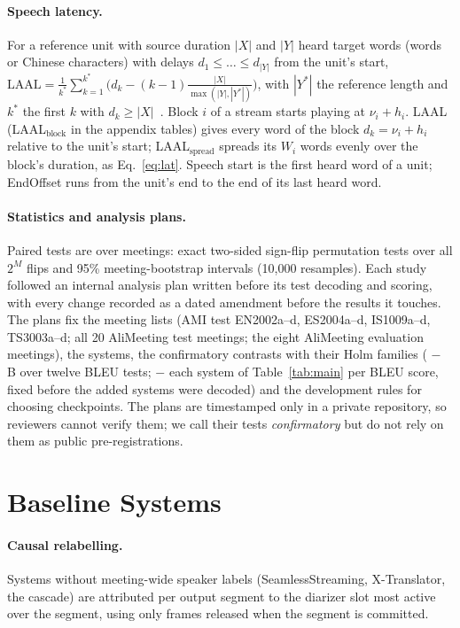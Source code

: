 \paragraph{Speech latency.} For a reference unit with source duration $|X|$ and $|Y|$ heard target words (words or
Chinese characters) with delays $d_1\le\dots\le d_{|Y|}$ from the unit's start,
$\mathrm{LAAL}=\frac{1}{k^\ast}\sum_{k=1}^{k^\ast}\big(d_k-(k-1)\frac{|X|}{\max(|Y|,|Y^\ast|)}\big)$, with $|Y^\ast|$ the
reference length and $k^\ast$ the first $k$ with $d_k\ge|X|$~\citep{papi2022over}. Block $i$ of a stream starts
playing at $\nu_i+h_i$. LAAL (LAAL$_\text{block}$ in the appendix tables) gives every word of the block
$d_k=\nu_i+h_i$ relative to the unit's start; LAAL$_\text{spread}$ spreads its $W_i$ words evenly over the block's
duration, as Eq.~\eqref{eq:lat}. Speech start is the first heard word of a unit; EndOffset runs from the unit's end to
the end of its last heard word.

\paragraph{Statistics and analysis plans.} Paired tests are over meetings: exact two-sided sign-flip permutation tests
over all $2^M$ flips and 95\% meeting-bootstrap intervals (10{,}000 resamples). Each study followed an internal analysis
plan written before its test decoding and scoring, with every change recorded as a dated amendment before the results
it touches. The plans fix the meeting lists (AMI test EN2002a--d, ES2004a--d, IS1009a--d, TS3003a--d; all 20 AliMeeting
test meetings; the eight AliMeeting evaluation meetings), the systems, the confirmatory contrasts with their Holm
families (\sys{} $-$ B over twelve BLEU tests; \sys{} $-$ each system of Table~\ref{tab:main} per BLEU score, fixed
before the added systems were decoded) and the development rules for choosing checkpoints. The plans are timestamped
only in a private repository, so reviewers cannot verify them; we call their tests \emph{confirmatory} but do not rely
on them as public pre-registrations.

\section{Baseline Systems}
\label{app:baselines}

\paragraph{Causal relabelling.} Systems without meeting-wide speaker labels (SeamlessStreaming, X-Translator, the
cascade) are attributed per output segment to the diarizer slot most active over the segment, using only frames
released when the segment is committed.

